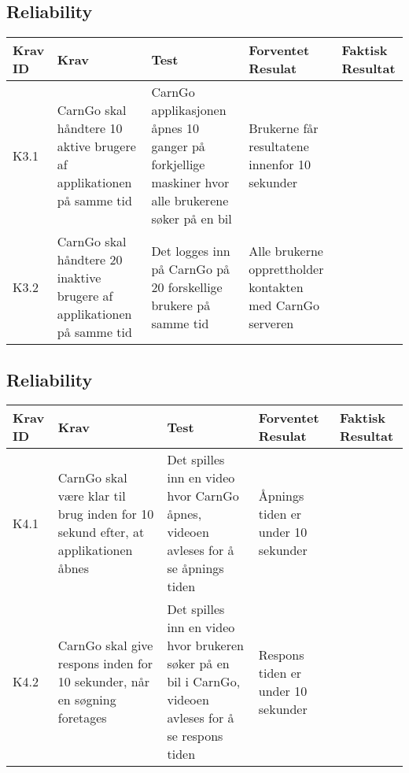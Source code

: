 \documentclass[Accepttestspecifikation/Accepttest_Main.tex]{subfiles}
\begin{document}
\subsection{Reliability}
\begin{table}[H]
\centering
\begin{tabular}{|L{0.07\textwidth}|L{0.2\textwidth}|L{0.2\textwidth}|L{0.2\textwidth}|L{0.2\textwidth}|}
\hline
\textbf{Krav ID} & \textbf{Krav} & \textbf{Test} & \textbf{Forventet Resulat} & \textbf{Faktisk Resultat} \\ \hline
K3.1 & CarnGo skal håndtere 10 aktive brugere af applikationen på samme tid  & CarnGo applikasjonen åpnes 10 ganger på forkjellige maskiner hvor alle brukerene søker på en bil & Brukerne får resultatene innenfor 10 sekunder &  \\ \hline
K3.2 & CarnGo skal håndtere 20 inaktive brugere af applikationen på samme tid  & Det logges inn på CarnGo på 20 forskellige brukere på samme tid & Alle brukerne opprettholder kontakten med CarnGo serveren &  \\ \hline
\end{tabular}
\end{table}




\subsection{Reliability}
\begin{table}[H]
\centering
\begin{tabular}{|L{0.07\textwidth}|L{0.2\textwidth}|L{0.2\textwidth}|L{0.2\textwidth}|L{0.2\textwidth}|}
\hline
\textbf{Krav ID} & \textbf{Krav} & \textbf{Test} & \textbf{Forventet Resulat} & \textbf{Faktisk Resultat} \\ \hline
K4.1  & CarnGo skal være klar til brug inden for 10 sekund efter, at applikationen åbnes  & Det spilles inn en video hvor CarnGo åpnes, videoen avleses for å se åpnings tiden & Åpnings tiden er under 10 sekunder &  \\ \hline
K4.2  & CarnGo skal give respons inden for 10 sekunder, når en søgning foretages &  Det spilles inn en video hvor brukeren søker på en bil i CarnGo, videoen avleses for å se respons tiden & Respons tiden er under 10 sekunder &  \\ \hline
\end{tabular}
\end{table}
\end{document}
